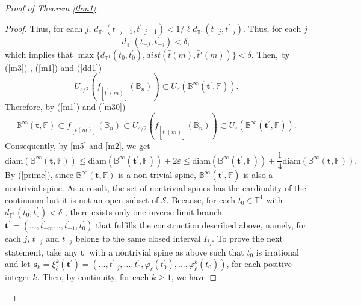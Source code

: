 \documentclass[11pt,reqno]{amsart}
\theoremstyle{plain}
\newtheorem*{theorem A}{Theorem A}
\newtheorem*{theorem B}{Theorem B}
\newtheorem*{theorem C}{Theorem C}
\newtheorem*{theorem 1}{Theorem 1}
\newtheorem*{theorem 2}{Theorem 2}
\newtheorem*{theorem 3}{Theorem 3}
\numberwithin{equation}{section}
\begin{document}
\begin{proof}[Proof of Theorem \ref{thm1}]
\begin{proof}
Thus, for each $j$, $d_{\mathbb{T}^1}(t_{-j-1} , t^{\prime}_{-j-1})< 1/\ell d_{\mathbb{T}^1}(t_{-j} , t^{\prime}_{-j})$.
Thus, for each $j$
\begin{equation}\label{dd1}
 d_{\mathbb{T}^1}(t_{-j} , t^{\prime}_{-j})<\delta,
\end{equation}
which implies that $\max\{d_{\mathbb{T}^1}(t_0, t^{\prime}_0), {dist} (\bar t(m) , \bar t'(m))\} < \delta.$
Then, by (\ref{m3}) , (\ref{m1}) and (\ref{dd1})
\begin{equation}\label{m30}
U_{\varepsilon/2}( f_{[\bar t^\prime(m)]}(\mathbb{B}_n))\subset U_{\varepsilon}(\mathbb{B}^{\infty}(\textbf{t}^\prime,\mathbb{F})).
\end{equation}
Therefore, by (\ref{m1}) and (\ref{m30})
\begin{equation}\label{m5}
\mathbb{B}^{\infty}(\textbf{t},\mathbb{F}) \subset f_{[\bar t(m)]}(\mathbb{B}_n)\subset U_{\varepsilon/2}(f_{[\bar t^{\prime}(m)]}(\mathbb{B}_n)) \subset U_{\varepsilon}(\mathbb{B}^{\infty}(\textbf{t}^{\prime},\mathbb{F})).
\end{equation}
Consequently, by \eqref{m5} and \eqref{m2}, we get
\begin{equation}\label{prime}
  \text{diam}(\mathbb{B}^{\infty}(\textbf{t},\mathbb{F}))\leq \text{diam}(\mathbb{B}^{\infty}(\textbf{t}^{\prime},\mathbb{F}))+2\varepsilon \leq \text{diam}(\mathbb{B}^{\infty}(\textbf{t}^{\prime},\mathbb{F})) + \frac{1}{4}\text{diam}(\mathbb{B}^{\infty}(\textbf{t},\mathbb{F})).
\end{equation}
By (\ref{prime}), since $\mathbb{B}^{\infty}(\textbf{t},\mathbb{F})$ is a non-trivial spine, $\mathbb{B}^{\infty}(\textbf{t}^{\prime},\mathbb{F})$ is also a nontrivial spine.
 As a result, the set of nontrivial spines has the cardinality of the continuum but it is not an open subset of $\mathcal{S}$.
Because, for each $t_0^{\prime}\in \mathbb{T}^1$ with $d_{\mathbb{T}^1}(t_{0} , t^{\prime}_{0})<\delta$ , there exists only one inverse limit branch $\textbf{t}^{\prime}=(\ldots, t^{\prime}_{-m}\ldots, t^{\prime}_{-1}, t^{\prime}_0)$ that fulfills the construction described above, namely, for each $j$, $t_{-j}$ and $t^{\prime}_{-j}$ belong to the same closed interval $I_{i_{j}}$.
To prove the next statement, take any $\textbf{t}^{\prime}$ with a nontrivial spine as above such that $t^{\prime}_{0}$ is irrational and let $\textbf{s}_k=\xi_\ell^k(\textbf{t}^{\prime})=(\dots, t^{\prime}_{-j}, \ldots, t^{\prime}_0, \varphi_\ell(t^{\prime}_0), \dots, \varphi_\ell^k(t^{\prime}_0))$, for each positive integer $k$.
Then, by continuity, for each $k\geq 1$, we have

\end{proof}
\end{proof}
\end{document}
